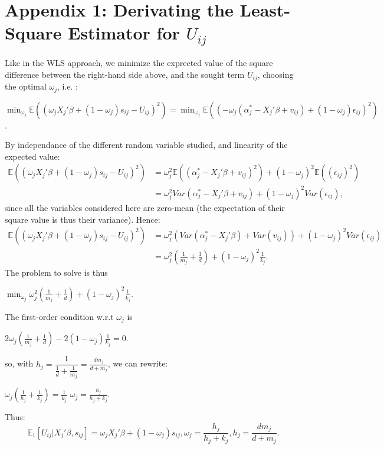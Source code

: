 
\section*{Appendix 1: Derivating the Least-Square Estimator for $U_{i j}$}

Like in the WLS approach, we minimize the exprected value of the square difference between the right-hand side above, and the sought term $U_{i j}$, choosing the optimal $\omega_{j}$, i.e. :
\begin{center}
	$\min_{\omega_{j}} \mathbb{E}((\omega_{j} X_{j}'\beta+(1-\omega_{j})s_{i j}-U_{i j})^{2})=\min_{\omega_{j}} \mathbb{E}((-\omega_{j} (\alpha_{j}^{*}-X_{j}'\beta+v_{i j})+(1-\omega_{j})\epsilon_{i j})^{2})$.
\end{center}
By independance of the different random variable studied, and linearity of the expected value:
\begin{align*}
	\mathbb{E}((\omega_{j} X_{j}'\beta+(1-\omega_{j})s_{i j}-U_{i j})^2)&=\omega_{j}^{2}\mathbb{E}((\alpha_{j}^{*}-X_{j}'\beta+v_{i j})^{2})+(1-\omega_{j})^{2}\mathbb{E}((\epsilon_{i j})^{2})\\
	&=\omega_{j}^{2}Var(\alpha_{j}^{*}-X_{j}'\beta+v_{i j})+(1-\omega_{j})^{2}Var(\epsilon_{i j}),
\end{align*}
since all the variables considered here are zero-mean (the expectation of their square value is thus their variance). Hence:
\begin{align*}
	\mathbb{E}((\omega_{j} X_{j}'\beta+(1-\omega_{j})s_{i j}-U_{i j})^2)&=\omega_{j}^{2}(Var(\alpha_{j}^{*}-X_{j}'\beta)+Var(v_{i j}))+(1-\omega_{j})^{2}Var(\epsilon_{i j})\\
	&=\omega_{j}^{2}\left(\frac{1}{m_{j}}+\frac{1}{d}\right)+(1-\omega_{j})^{2}\frac{1}{k_{j}}.
\end{align*}
The problem to solve is thus
\begin{center}
	$\min_{\omega_{j}} \omega_{j}^{2}(\frac{1}{m_{j}}+\frac{1}{d})+(1-\omega_{j})^{2}\frac{1}{k_{j}}$.
\end{center}
The first-order condition w.r.t $\omega_{j}$ is 
\begin{center}
	$2\omega_{j}(\frac{1}{m_{j}}+\frac{1}{d})-2(1-\omega_{j})\frac{1}{k_{j}}=0$.
\end{center}
so, with $h_{j}=\dfrac{1}{\frac{1}{d}+\frac{1}{m_{j}}}=\frac{d m_{j}}{d+m_{j}}$, we can rewrite:
\begin{center}
	$\omega_{j}(\frac{1}{h_{j}}+\frac{1}{k_{j}})=\frac{1}{k_{j}}$
	$\omega_j=\frac{h_{j}}{h_{j}+k_{j}}$.
\end{center}
Thus:
\begin{equation}
	\mathbb{E}_1[U_{i j}|X_{j}'\beta, s_{i j}]=\omega_{j} X_{j}'\beta+(1-\omega_{j})s_{i j}, \omega_j=\frac{h_{j}}{h_{j}+k_{j}}, h_{j}=\frac{d m_{j}}{d+m_{j}}.
\end{equation}
	
